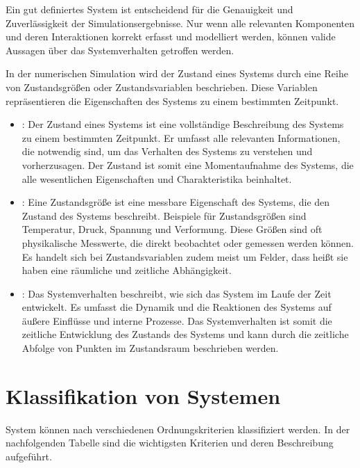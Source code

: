 \documentclass[letterpaper,10pt,german]{jupyterBook}
\begin{document}
\sphinxAtStartPar
Ein gut definiertes System ist entscheidend für die Genauigkeit und Zuverlässigkeit der Simulationsergebnisse. Nur wenn alle relevanten Komponenten und deren Interaktionen korrekt erfasst und modelliert werden, können valide Aussagen über das Systemverhalten getroffen werden.

\sphinxAtStartPar
{}

\sphinxAtStartPar
In der numerischen Simulation wird der Zustand eines Systems durch eine Reihe von Zustandsgrößen oder Zustandsvariablen beschrieben. Diese Variablen repräsentieren die Eigenschaften des Systems zu einem bestimmten Zeitpunkt.
\begin{itemize}
\item {} 
\sphinxAtStartPar
{}: Der Zustand eines Systems ist eine vollständige Beschreibung des Systems zu einem bestimmten Zeitpunkt. Er umfasst alle relevanten Informationen, die notwendig sind, um das Verhalten des Systems zu verstehen und vorherzusagen. Der Zustand ist somit eine Momentaufnahme des Systems, die alle wesentlichen Eigenschaften und Charakteristika beinhaltet.

\item {} 
\sphinxAtStartPar
{}: Eine Zustandsgröße ist eine messbare Eigenschaft des Systems, die den Zustand des Systems beschreibt. Beispiele für Zustandsgrößen sind Temperatur, Druck, Spannung und Verformung. Diese Größen sind oft physikalische Messwerte, die direkt beobachtet oder gemessen werden können. Es handelt sich bei Zustandsvariablen zudem meist um Felder, dass heißt sie haben eine räumliche und zeitliche Abhängigkeit.

\item {} 
\sphinxAtStartPar
{}: Das Systemverhalten beschreibt, wie sich das System im Laufe der Zeit entwickelt. Es umfasst die Dynamik und die Reaktionen des Systems auf äußere Einflüsse und interne Prozesse. Das Systemverhalten ist somit die zeitliche Entwicklung des Zustands des Systems und kann durch die zeitliche Abfolge von Punkten im Zustandsraum beschrieben werden.

\end{itemize}


\section{Klassifikation von Systemen}
\label{\detokenize{chapters/chapter1/Einf_xfchrung_Konstruktion:klassifikation-von-systemen}}
\sphinxAtStartPar
System können nach verschiedenen Ordnungskriterien klassifiziert werden. In der nachfolgenden Tabelle sind die wichtigsten Kriterien und deren Beschreibung aufgeführt.
\end{document}
